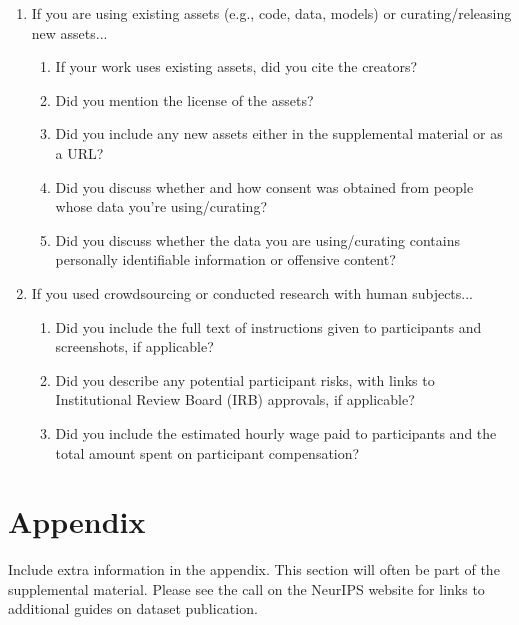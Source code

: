 \documentclass{article}
\begin{document}
\begin{enumerate}
\item If you are using existing assets (e.g., code, data, models) or curating/releasing new assets...
\begin{enumerate}
  \item If your work uses existing assets, did you cite the creators?
    \answerTODO{}
  \item Did you mention the license of the assets?
    \answerTODO{}
  \item Did you include any new assets either in the supplemental material or as a URL?
    \answerTODO{}
  \item Did you discuss whether and how consent was obtained from people whose data you're using/curating?
    \answerTODO{}
  \item Did you discuss whether the data you are using/curating contains personally identifiable information or offensive content?
    \answerTODO{}
\end{enumerate}

\item If you used crowdsourcing or conducted research with human subjects...
\begin{enumerate}
  \item Did you include the full text of instructions given to participants and screenshots, if applicable?
    \answerTODO{}
  \item Did you describe any potential participant risks, with links to Institutional Review Board (IRB) approvals, if applicable?
    \answerTODO{}
  \item Did you include the estimated hourly wage paid to participants and the total amount spent on participant compensation?
    \answerTODO{}
\end{enumerate}

\end{enumerate}


\appendix

\section{Appendix}

Include extra information in the appendix. This section will often be part of the supplemental material. Please see the call on the NeurIPS website for links to additional guides on dataset publication.
\end{document}
